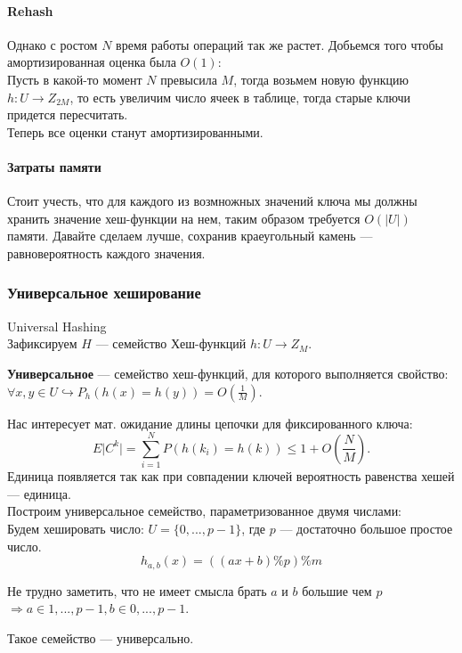 \paragraph{Rehash}
Однако с ростом $N$ время работы операций так же растет. Добьемся того чтобы амортизированная оценка была  $O(1)$: \\
Пусть в какой-то момент  $N$ превысила  $M$, тогда возьмем новую функцию  $h: U \to Z_{2M}$, то есть увеличим число ячеек в таблице, 
тогда старые ключи придется пересчитать. \\ 
Теперь все оценки станут амортизированными. \\

\paragraph{Затраты памяти}
Стоит учесть, что для каждого из возмножных значений ключа мы должны хранить значение хеш-функции на нем,
таким образом требуется $O(\lvert U \rvert)$ памяти. Давайте сделаем лучше, сохранив краеугольный камень --- равновероятность каждого значения. 

\subsubsection{Универсальное хеширование}
Universal Hashing \\

Зафиксируем $H$ --- семейство Хеш-функций  $h: U \to Z_M$. \\
 \begin{Def}
     \textbf{Универсальное} --- семейство хеш-функций, для которого выполняется свойство: 
      $\forall x, y \in U \hookrightarrow P_h(h(x) = h(y)) = O(\frac{1}{M})$.
\end{Def}

Нас интересует мат. ожидание длины цепочки для фиксированного ключа:
\[
    E\lvert C^k \rvert = \sum \limits _{i = 1}^{N} P(h(k_i) = h(k)) \leq 1 + O(\frac{N}{M})
.\] 
Единица появляется так как при совпадении ключей вероятность равенства хешей --- единица. \\

Построим универсальное семейство, параметризованное двумя числами: \\
Будем хешировать число: $U = \{0, ..., p - 1\}$, где  $p$ --- достаточно большое простое число. \\
\[
    h_{a, b}(x) = ((ax + b) \% p) \% m
\]

Не трудно заметить, что не имеет смысла брать $a$ и  $b$ большие чем  $p$  $\Rightarrow a \in {1, ..., p - 1}, b \in {0, ..., p - 1}$. \\
\begin{prop}
   Такое семейство --- универсально.
\end{prop}


